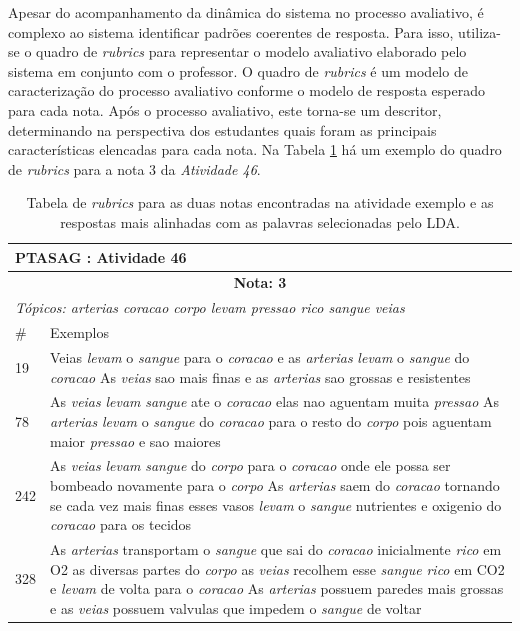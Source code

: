 Apesar do acompanhamento da dinâmica do sistema no processo avaliativo, é complexo ao sistema identificar padrões coerentes de resposta. Para isso, utiliza-se o quadro de \textit{rubrics} para representar o modelo avaliativo elaborado pelo sistema em conjunto com o professor. O quadro de \textit{rubrics} é um modelo de caracterização do processo avaliativo conforme o modelo de resposta esperado para cada nota. Após o processo avaliativo, este torna-se um descritor, determinando na perspectiva dos estudantes quais foram as principais características elencadas para cada nota. Na Tabela \ref{tab-rubrics-exemplo} há um exemplo do quadro de \textit{rubrics} para a nota 3 da \textit{Atividade 46}.

\begin{table}[!h]
\centering
\caption{Tabela de \textit{rubrics} para as duas notas encontradas na atividade exemplo e as respostas mais alinhadas com as palavras selecionadas pelo LDA.}
\label{tab-rubrics-exemplo}
\footnotesize
\begin{tabular}{ p{2cm} | p{14cm}}
\multicolumn{2}{l}{\textbf{PTASAG : Atividade 46}} \\ \hline
\multicolumn{2}{c}{\textbf{Nota: 3}} \\ \hline 
\multicolumn{2}{l}{\textit{T{\'o}picos: arterias coracao corpo levam pressao rico sangue veias}} \\ \hline
 \# & Exemplos \\ \hline
19 & Veias \textit{levam} o \textit{sangue} para o \textit{coracao} e as \textit{arterias} \textit{levam} o \textit{sangue} do \textit{coracao} As \textit{veias} sao mais finas e as \textit{arterias} sao grossas e resistentes\\ \hline
78 & As \textit{veias} \textit{levam} \textit{sangue} ate o \textit{coracao} elas nao aguentam muita \textit{pressao} As \textit{arterias} \textit{levam} o \textit{sangue} do \textit{coracao} para o resto do \textit{corpo} pois aguentam maior \textit{pressao} e sao maiores\\ \hline
242 & As \textit{veias} \textit{levam} \textit{sangue} do \textit{corpo} para o \textit{coracao} onde ele possa ser bombeado novamente para o \textit{corpo} As \textit{arterias} saem do \textit{coracao} tornando se cada vez mais finas esses vasos \textit{levam} o \textit{sangue} nutrientes e oxigenio do \textit{coracao} para os tecidos\\ \hline
328 & As \textit{arterias} transportam o \textit{sangue} que sai do \textit{coracao} inicialmente \textit{rico} em O2 as diversas partes do \textit{corpo} as \textit{veias} recolhem esse \textit{sangue} \textit{rico} em CO2 e \textit{levam} de volta para o \textit{coracao} As \textit{arterias} possuem paredes mais grossas e as \textit{veias} possuem valvulas que impedem o \textit{sangue} de voltar\\ \hline

\end{tabular}
\end{table}
